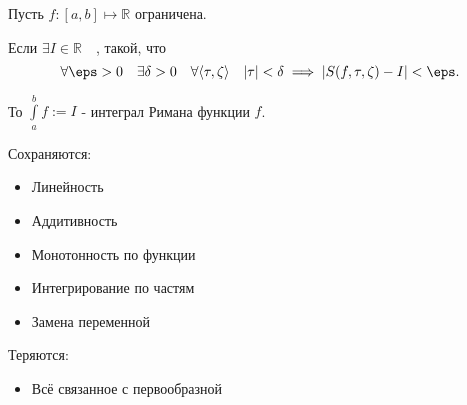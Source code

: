 \begin{definition} \thmslashn 

    Пусть $f : [a, b] \mapsto \mathbb{R}$ ограничена.

    Если $\exists{I\in \mathbb{R}}\quad$, такой, что
    \[ \forall{\eps > 0}\quad \exists{\delta > 0}\quad \forall{\left<\tau, \zeta\right>}\quad |\tau| < \delta \implies |S(f, \tau, \zeta) - I| < \eps .\]

    То $\int\limits_{a}^{b} f := I $ - интеграл Римана функции $f$.
\end{definition}
\begin{properties} \thmslashn

    Сохраняются:
    \begin{itemize}
        \item Линейность
        \item Аддитивность
        \item Монотонность по функции
        \item Интегрирование по частям
        \item Замена переменной
    \end{itemize}
    Теряются:
    \begin{itemize}
        \item Всё связанное с первообразной
    \end{itemize}
\end{properties}
